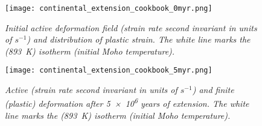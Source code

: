 \begin{figure}
\centering
\texttt{[image: continental\_extension\_cookbook\_0myr.png]}
\caption{\it Initial active deformation field (strain rate second invariant in units of $\si{s}^{-1}$) and distribution of plastic strain. The white line marks the (\SI{893}{K}) isotherm (initial Moho temperature).}
\label{fig:continental_extension_cookbook_0myr}
\end{figure}
\begin{figure}
\texttt{[image: continental\_extension\_cookbook\_5myr.png]}
\caption{\it Active (strain rate second invariant in units of $\si{s}^{-1}$) and finite (plastic) deformation after \num{5e6} years of extension. The white line marks the (\SI{893}{K}) isotherm (initial Moho temperature).}
\label{fig:continental_extension_cookbook_5myr}
\end{figure}
